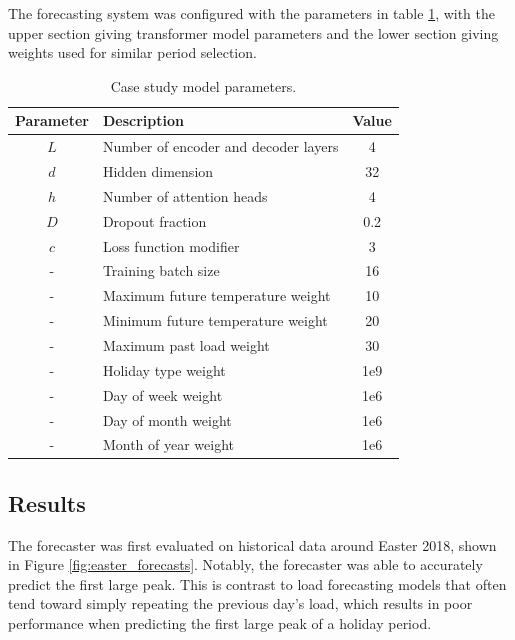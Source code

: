 \documentclass[conference]{IEEEtran}
\begin{document}
The forecasting system was configured with the parameters in table \ref{table:parameters}, with the upper section giving transformer model parameters and the lower section giving weights used for similar period selection.

\begin{table}[htbp]
	\caption{Case study model parameters.}
	\begin{center}
		\begin{tabular}{clc}
			\textbf{Parameter}&\textbf{Description}&\textbf{Value} \\
			\hline
			$L$ & Number of encoder and decoder layers & 4 \\
			$d$ & Hidden dimension & 32 \\
			$h$ & Number of attention heads & 4 \\
			$D$ & Dropout fraction & 0.2 \\
			$c$ & Loss function modifier & 3 \\
			-   & Training batch size & 16 \\
			\hline
			-   & Maximum future temperature weight & 10 \\
			-   & Minimum future temperature weight & 20 \\
			-   & Maximum past load weight & 30 \\
			-   & Holiday type weight & 1e9 \\
			-   & Day of week weight & 1e6 \\
			-   & Day of month weight & 1e6 \\
			-   & Month of year weight & 1e6 \\
			
		\end{tabular}
		\label{table:parameters}
	\end{center}
\end{table}

\subsection{Results}

The forecaster was first evaluated on historical data around Easter 2018, shown in Figure \ref{fig:easter_forecasts}.
Notably, the forecaster was able to accurately predict the first large peak.
This is contrast to load forecasting models that often tend toward simply repeating the previous day's load, which results in poor performance when predicting the first large peak of a holiday period.
\end{document}
